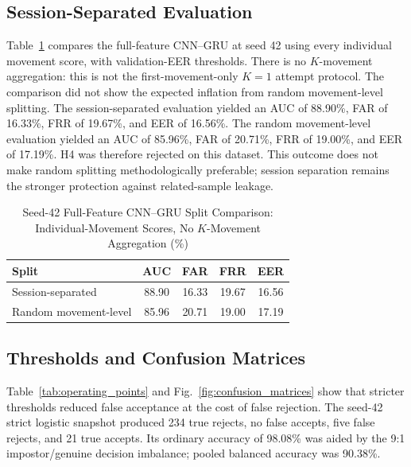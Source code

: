 \documentclass[conference]{IEEEtran}
\begin{document}
\subsection{Session-Separated Evaluation}

Table~\ref{tab:split_comparison} compares the full-feature CNN--GRU at seed 42
using every individual movement score, with validation-EER thresholds.
There is no $K$-movement aggregation: this is not the first-movement-only
$K=1$ attempt protocol. The comparison did not show the expected inflation
from random movement-level splitting. The session-separated evaluation yielded an
AUC of 88.90\%, FAR of 16.33\%, FRR of 19.67\%, and EER of 16.56\%. The random
movement-level evaluation yielded an AUC of 85.96\%, FAR of 20.71\%, FRR of
19.00\%, and EER of 17.19\%. H4 was therefore rejected on this dataset.
This outcome does not make random splitting methodologically preferable;
session separation remains the stronger protection against related-sample
leakage.

\begin{table}[t]
\centering
\caption{Seed-42 Full-Feature CNN--GRU Split Comparison: Individual-Movement
Scores, No $K$-Movement Aggregation (\%)}
\label{tab:split_comparison}
\begin{tabular}{lcccc}
\toprule
Split & AUC & FAR & FRR & EER \\
\midrule
Session-separated & 88.90 & 16.33 & 19.67 & 16.56 \\
Random movement-level & 85.96 & 20.71 & 19.00 & 17.19 \\
\bottomrule
\end{tabular}
\end{table}

\subsection{Thresholds and Confusion Matrices}

Table~\ref{tab:operating_points} and Fig.~\ref{fig:confusion_matrices} show
that stricter thresholds reduced false acceptance at the cost of false rejection.
The seed-42 strict logistic snapshot produced 234 true rejects, no false
accepts, five false rejects, and 21 true accepts. Its ordinary accuracy of
98.08\% was aided by the 9:1 impostor/genuine decision imbalance; pooled
balanced accuracy was 90.38\%.
\end{document}
